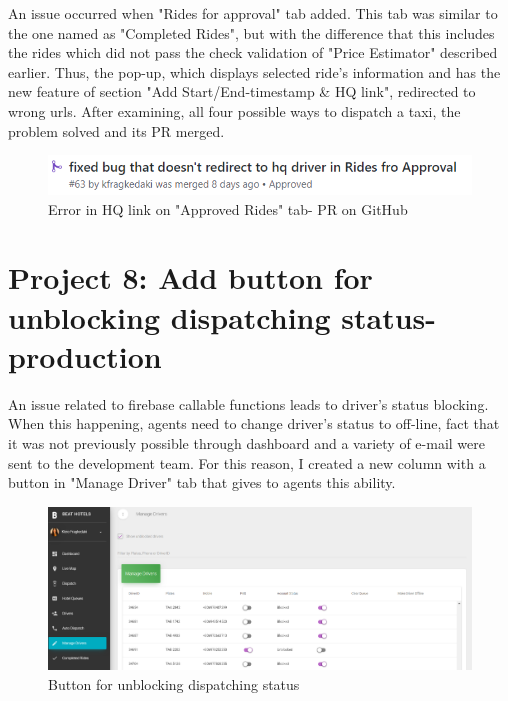 An issue occurred when "Rides for approval" tab added. This tab was similar to the one named as "Completed Rides", but with the difference that this includes the rides which did not pass the check validation of "Price Estimator" described earlier. Thus, the pop-up, which displays selected ride's information and has the new feature of section "Add Start/End-timestamp \& HQ link", redirected to wrong urls. After examining, all four possible ways to dispatch a taxi, the problem solved and its PR merged.

\begin{figure}[H]
	\begin{center}
		\includegraphics[scale=0.85]{images/my_projects/fix-doesnot-redirect-to-HQ-PR.png}
	\end{center}
	\caption{Error in HQ link on "Approved Rides" tab- PR on GitHub}
\end{figure}

\section{Project 8: Add button for unblocking dispatching status-production}

An issue related to firebase callable functions leads to driver's status blocking. When this happening, agents need to change driver's status to off-line, fact that it was not previously possible through dashboard and a variety of e-mail were sent to the development team. For this reason, I created a new column with a button in "Manage Driver" tab that gives to agents this ability.

\begin{figure}[H]
	\begin{center}
		\includegraphics[scale=0.35]{images/my_projects/feature-add-add-button.png}
	\end{center}
	\caption{Button for unblocking dispatching status}
\end{figure}

